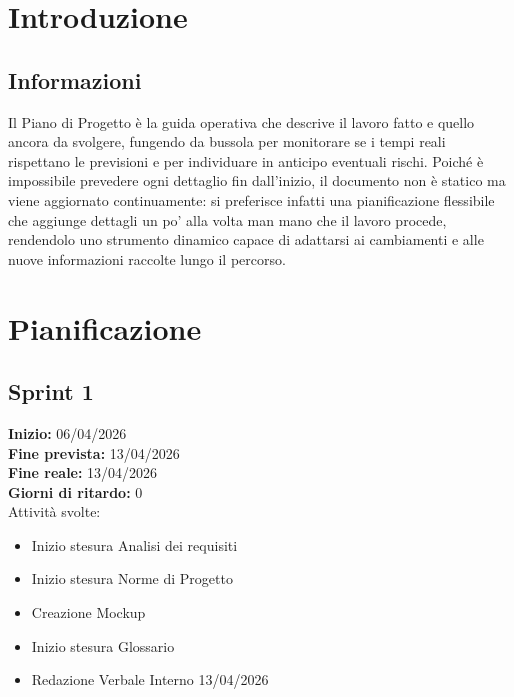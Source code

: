 \documentclass[a4paper,12pt]{article}
\begin{document}
\newpage
{}
\setcounter{page}{1}
\newpage

\tableofcontents

\newpage

\section{Introduzione}

\subsection{Informazioni}
Il Piano di Progetto è la guida operativa che descrive il lavoro fatto e quello ancora da svolgere, fungendo da bussola per monitorare se i tempi reali rispettano le previsioni e per individuare in anticipo eventuali rischi. Poiché è impossibile prevedere ogni dettaglio fin dall'inizio, il documento non è statico ma viene aggiornato continuamente: si preferisce infatti una pianificazione flessibile che aggiunge dettagli un po' alla volta man mano che il lavoro procede, rendendolo uno strumento dinamico capace di adattarsi ai cambiamenti e alle nuove informazioni raccolte lungo il percorso.

\section{Pianificazione}
\subsection{Sprint 1}

\textbf{Inizio:} 06/04/2026 \\
\textbf{Fine prevista:} 13/04/2026 \\
\textbf{Fine reale:} 13/04/2026 \\
\textbf{Giorni di ritardo:} 0 \\

\noindent Attività svolte:
\begin{itemize}
    \item Inizio stesura Analisi dei requisiti
    \item Inizio stesura Norme di Progetto
    \item Creazione Mockup
    \item Inizio stesura Glossario
    \item Redazione Verbale Interno 13/04/2026
\end{itemize}
\end{document}
